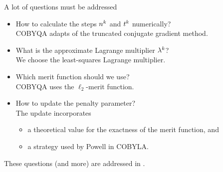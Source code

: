 \documentclass[
]{presentation}
\newcommand{\lm}[1][]{\lambda\ifblank{#1}{}{^{#1}}}
\newcommand{\nstep}[1][]{n\ifblank{#1}{}{^{#1}}}
\newcommand{\tstep}[1][]{t\ifblank{#1}{}{^{#1}}}
\begin{document}
\begin{frame}{A lot of questions must be addressed}
    \begin{itemize}
        \item How to calculate the steps $\nstep[k]$ and $\tstep[k]$ numerically?\\
        \textcolor{FernGreen}{COBYQA adapts of the truncated conjugate gradient method.}
        \item What is the approximate Lagrange multiplier $\lm[k]$?\\
        \textcolor{FernGreen}{We choose the least-squares Lagrange multiplier.}
        \item Which merit function should we use?\\
        \textcolor{FernGreen}{COBYQA uses the $\ell_2$-merit function.}
        \item How to update the penalty parameter?\\
        \textcolor{FernGreen}{The update incorporates}
        \begin{itemize}
            \item \textcolor{FernGreen}{a theoretical value for the exactness of the merit function, and}
            \item \textcolor{FernGreen}{a strategy used by Powell in COBYLA.}
        \end{itemize}
    \end{itemize}

    \bigskip

    These questions (and more) are addressed in \textcite{Ragonneau_2022}.
\end{frame}
\end{document}
